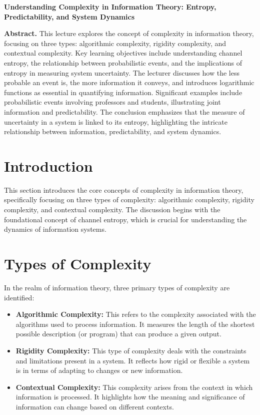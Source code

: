 \documentclass[a4paper]{article}
\begin{document}
\begin{center}
{\LARGE \textbf{Understanding Complexity in Information Theory: Entropy, Predictability, and System Dynamics}}\\[1em]
\end{center}

\textbf{Abstract.} This lecture explores the concept of complexity in information theory, focusing on three types: algorithmic complexity, rigidity complexity, and contextual complexity. Key learning objectives include understanding channel entropy, the relationship between probabilistic events, and the implications of entropy in measuring system uncertainty. The lecturer discusses how the less probable an event is, the more information it conveys, and introduces logarithmic functions as essential in quantifying information. Significant examples include probabilistic events involving professors and students, illustrating joint information and predictability. The conclusion emphasizes that the measure of uncertainty in a system is linked to its entropy, highlighting the intricate relationship between information, predictability, and system dynamics.

\section{Introduction}
This section introduces the core concepts of complexity in information theory, specifically focusing on three types of complexity: algorithmic complexity, rigidity complexity, and contextual complexity. The discussion begins with the foundational concept of channel entropy, which is crucial for understanding the dynamics of information systems.

\section{Types of Complexity}
In the realm of information theory, three primary types of complexity are identified:

\begin{itemize}
    \item \textbf{Algorithmic Complexity:} This refers to the complexity associated with the algorithms used to process information. It measures the length of the shortest possible description (or program) that can produce a given output.
    
    \item \textbf{Rigidity Complexity:} This type of complexity deals with the constraints and limitations present in a system. It reflects how rigid or flexible a system is in terms of adapting to changes or new information.
    
    \item \textbf{Contextual Complexity:} This complexity arises from the context in which information is processed. It highlights how the meaning and significance of information can change based on different contexts.
\end{itemize}
\end{document}

